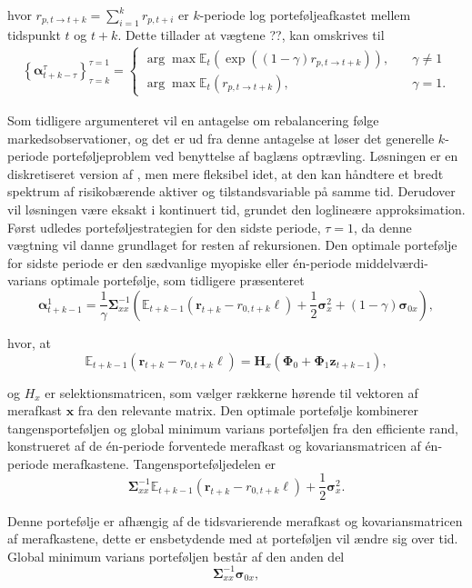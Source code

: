 \documentclass[
  a4paper,
  oneside]{memoir}
\begin{document}
hvor \(r_{p,t\to t+k}=\sum_{i=1}^k r_{p,t+i}\) er \(k\)-periode log porteføljeafkastet mellem tidspunkt \(t\) og \(t+k\). Dette tillader at vægtene ??, kan omskrives til
\begin{align}
\left\{\bm{\alpha}_{t+k-\tau}^\tau\right\}_{\tau=k}^{\tau=1}=\begin{cases}
\arg\max\mathbb{E}_t(\exp ((1-\gamma) r_{p,t\to t+k})),\quad &\gamma\neq 1\\
\arg\max\mathbb{E}_t(r_{p,t\to t+k}),\quad &\gamma=1.
\end{cases}
\end{align}

Som tidligere argumenteret vil en antagelse om rebalancering følge markedsobservationer, og det er ud fra denne antagelse at \citep{JurVic2011} løser det generelle \(k\)-periode porteføljeproblem ved benyttelse af baglæns optrævling. Løsningen er en diskretiseret version af \citep{Liu2007}, men mere fleksibel idet, at den kan håndtere et bredt spektrum af risikobærende aktiver og tilstandsvariable på samme tid. Derudover vil løsningen være eksakt i kontinuert tid, grundet den loglineære approksimation. Først udledes porteføljestrategien for den sidste periode, \(\tau=1\), da denne vægtning vil danne grundlaget for resten af rekursionen. Den optimale portefølje for sidste periode er den sædvanlige myopiske eller én-periode middelværdi-varians optimale portefølje, som tidligere præsenteret
\[\bm{\alpha}_{t+k-1}^1=\frac{1}{\gamma}\bm{\Sigma}_{xx}^{-1}\left(\mathbb{E}_{t+k-1}(\bm{r}_{t+k}-r_{0,t+k}\bm{\ell})+\frac{1}{2}\bm{\sigma}_x^2 + (1-\gamma) \bm{\sigma}_{0x}\right),\]

hvor, at
\[\mathbb{E}_{t+k-1}(\bm{r}_{t+k}-r_{0,t+k}\bm{\ell})=\bm{H}_x(\bm{\Phi}_0 + \bm{\Phi}_1 \bm{z}_{t+k-1}),\]

og \(H_x\) er selektionsmatricen, som vælger rækkerne hørende til vektoren af merafkast \(\bm{x}\) fra den relevante matrix. Den optimale portefølje kombinerer tangensporteføljen og global minimum varians porteføljen fra den efficiente rand, konstrueret af de én-periode forventede merafkast og kovariansmatricen af én-periode merafkastene. Tangensporteføljedelen er
\[\bm{\Sigma}_{xx}^{-1}\mathbb{E}_{t+k-1}(\bm{r}_{t+k}-r_{0,t+k}\bm{\ell})+\frac{1}{2}\bm{\sigma}_x^2.\]

Denne portefølje er afhængig af de tidsvarierende merafkast og kovariansmatricen af merafkastene, dette er ensbetydende med at porteføljen vil ændre sig over tid. Global minimum varians porteføljen består af den anden del
\[\bm{\Sigma}_{xx}^{-1}\bm{\sigma}_{0x},\]
\end{document}
